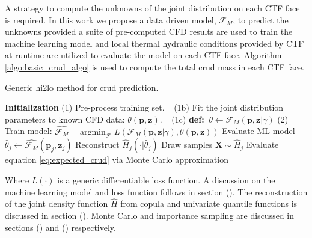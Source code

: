 A strategy to compute the unknowns of the joint distribution on each CTF face is required.  In this work we propose a data driven model, $\mathcal F_M$, to predict the unknowns provided a suite of pre-computed CFD results are used to train the machine learning model and local thermal hydraulic conditions provided by CTF at runtime are utilized to evaluate the model on each CTF face. Algorithm \ref{algo:basic_crud_algo} is used to compute the total crud mass in each CTF face.

\begin{algorithm}[H]
    \caption{Generic hi2lo method for crud prediction.}
    \begin{algorithmic}      
    \STATE \textbf{Initialization}  
    \STATE (1) Pre-process training set.  
    \STATE $\ \ $   (1b) Fit the joint distribution parameters to known CFD data: $\theta(\mathbf p, \mathbf z)$.  
    \STATE $\ \ $   (1c) \textbf{def:}  $\ \theta \leftarrow \mathcal F_M(\mathbf p, \mathbf z | \gamma)$
    \STATE (2) Train model:  $\hat{\mathcal F_M} =  \mathrm{argmin}_{\mathcal F}$
      $L(\mathcal{F}_M (\mathbf p, \mathbf z| \gamma), \theta(\mathbf p, \mathbf z)) $
    \STATE Evaluate ML model $\hat \theta_j \leftarrow \hat{\mathcal F_M}(\mathbf p_j, \mathbf z_j)$ \;
    \STATE Reconstruct $\hat H_j(\cdot |\hat \theta_j)$ \;
    \STATE Draw samples $\mathbf X \sim \hat H_j$ \;
    \STATE Evaluate equation \ref{eq:expected_crud} via Monte Carlo approximation \;
\ENDFOR
    \end{algorithmic}
\label{algo:basic_crud_algo}
\end{algorithm}
Where $L(\cdot)$ is a generic differentiable loss function.  A discussion on the machine learning model and loss function follows in section ().  The reconstruction of the joint density function $\hat H$ from copula and univariate quantile functions is discussed in section ().  Monte Carlo and importance sampling are discussed in sections () and () respectively.  


